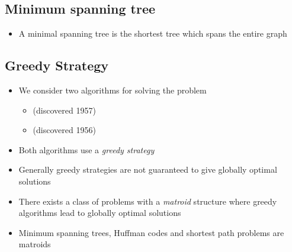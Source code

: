 
\begin{slide}
\section[-2]{Minimum spanning tree}

\pausebuild
\color{TwoColor}
\begin{itemize}
\item  A minimal spanning tree is the shortest tree which spans the
  entire graph\pause
  \vspace*{-1cm}
  \begin{center}\color{TextColor}
    \pause
  \end{center}
  \vspace*{-1cm}
\end{itemize}
\end{slide}


\begin{slide}
\section{Greedy Strategy}

\begin{PauseHighLight}
  \begin{itemize}
  \item We consider two algorithms for solving the problem
    \begin{itemize}
    \item {} (discovered 1957)
    \item {} (discovered 1956)\pause
    \end{itemize}
  \item Both algorithms use a \emph{greedy strategy}\pause
  \item Generally greedy strategies are not guaranteed to give
    globally optimal solutions\pause
  \item There exists a class of problems with a \emph{matroid}
    structure where greedy algorithms lead to globally optimal
    solutions\pause
  \item Minimum spanning trees, Huffman codes and shortest path
    problems are matroids\pause
  \end{itemize}
\end{PauseHighLight}

\end{slide}


